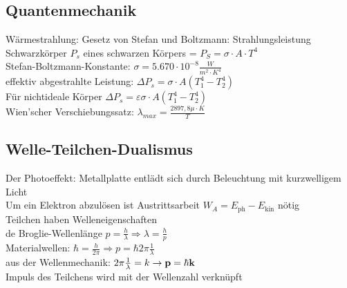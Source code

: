 \documentclass[fs, footer]{latex4ei}
\begin{document}
\begin{multicols*}{4}
\vspace{-8mm}
\section{Quantenmechanik}

Wärmestrahlung: Gesetz von Stefan und Boltzmann: 
Strahlungsleistung Schwarzkörper $P_s$ eines schwarzen Körpers = $ P_S = \sigma\cdot A\cdot T^4 $\\
Stefan-Boltzmann-Konstante: $\sigma = 5.670 \cdot 10^{-8}\frac{W}{m^2\cdot K^4}$\\
effektiv abgestrahlte Leistung: $\Delta P_s = \sigma\cdot A (T_1^4-T_2^4)$\\

Für nichtideale Körper $\Delta P_s = \varepsilon\sigma\cdot A (T_1^4-T_2^4)$\\
Wien'scher Verschiebungssatz: $\lambda_{max} = \frac{2897,8\mu\cdot K}{T}$\\

\subsection{Welle-Teilchen-Dualismus}
Der Photoeffekt: Metallplatte entlädt sich durch Beleuchtung mit kurzwelligem Licht\\
Um ein Elektron abzulösen ist Austrittsarbeit $W_A = E_{\text{ph}} - E_{\text{kin}}$ nötig\\

Teilchen haben Welleneigenschaften\\
de Broglie-Wellenlänge $p = \frac{h}{\lambda} \Rightarrow \lambda = \frac{h}{p}$\\
Materialwellen: $\hbar = \frac{h}{2\pi} \Rightarrow p = \hbar 2\pi \frac{1}{\lambda}$\\
aus der Wellenmechanik: $2\pi\frac{1}{\lambda} = k \rightarrow \textbf{p} = \hbar \textbf{k}$\\
Impuls des Teilchens wird mit der Wellenzahl verknüpft\\


\end{multicols*}
\end{document}
